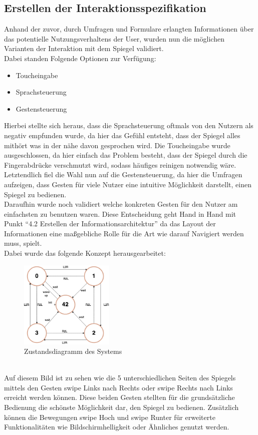 \documentclass[12pt, a4paper]{scrartcl}
\begin{document}
	\subsection{Erstellen der Interaktionsspezifikation}
	Anhand der zuvor, durch Umfragen und Formulare erlangten Informationen über das potentielle Nutzungsverhaltens der User, wurden nun die möglichen Varianten der Interaktion mit dem Spiegel validiert.\\
	Dabei standen Folgende Optionen zur Verfügung:
	\begin{itemize}
		\setlength\itemsep{-0.5em}
		\item Toucheingabe
		\item Sprachsteuerung
		\item Gestensteuerung
	\end{itemize}
	Hierbei stellte sich heraus, dass die Sprachsteuerung oftmals von den Nutzern als negativ empfunden wurde, da hier das Gefühl entsteht, dass der Spiegel alles mithört was in der nähe davon gesprochen wird. Die Toucheingabe wurde ausgeschlossen, da hier einfach das Problem besteht, dass der Spiegel durch die Fingerabdrücke verschmutzt wird, sodass häufiges reinigen notwendig wäre.\\
	Letztendlich fiel die Wahl nun auf die Gestensteuerung, da hier die Umfragen aufzeigen, dass Gesten für viele Nutzer eine intuitive Möglichkeit darstellt, einen Spiegel zu bedienen.\\
	Daraufhin wurde noch validiert welche konkreten Gesten für den Nutzer am einfachsten zu benutzen waren. Diese Entscheidung geht Hand in Hand mit Punkt “4.2 Erstellen der Informationsarchitektur” da das Layout der Informationen eine maßgebliche Rolle für die Art wie darauf Navigiert werden muss, spielt.\\
	Dabei wurde das folgende Konzept herausgearbeitet:
	\begin{figure}[h!] 
		\centering
		\includegraphics[width=0.4\textwidth]{img/Zustandsdiagramm.png}
		\captionsetup{labelformat=empty}
		\caption{Zustandsdiagramm des Systems}
	\end{figure}\\
	Auf diesem Bild ist zu sehen wie die 5 unterschiedlichen Seiten des Spiegels mittels den Gesten swipe Links nach Rechts oder swipe Rechts nach Links erreicht werden können.
	Diese beiden Gesten stellten für die grundsätzliche Bedienung die schönste Möglichkeit dar, den Spiegel zu bedienen. Zusätzlich können die Bewegungen swipe Hoch und swipe Runter für erweiterte Funktionalitäten wie Bildschirmhelligkeit oder Ähnliches genutzt werden.
	
\end{document}
